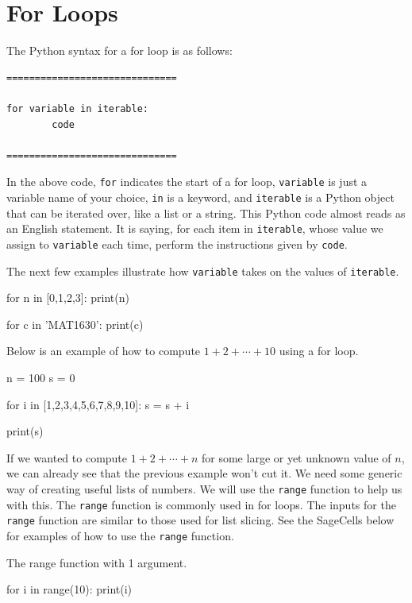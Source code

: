 \documentclass{ximera}
\begin{document}
\section{For Loops}

The Python syntax for a for loop is as follows:

\begin{verbatim}
==============================

for variable in iterable:
        code

==============================
\end{verbatim}

In the above code, \verb|for| indicates the start of a for loop, \verb|variable| is just a variable name of your choice, \verb|in| is a keyword, and \verb|iterable| is a Python object that can be iterated over, like a list or a string. This Python code almost reads as an English statement. It is saying, for each item in \verb|iterable|, whose value we assign to \verb|variable| each time, perform the instructions given by \verb|code|.

The next few examples illustrate how \verb|variable| takes on the values of \verb|iterable|.

\begin{sageCell}
for n in [0,1,2,3]:
        print(n)
\end{sageCell}

\begin{sageCell}
for c in 'MAT1630':
        print(c)
\end{sageCell}

Below is an example of how to compute $1+2+\cdots+10$ using a for loop. 

\begin{sageCell}
n = 100
s = 0

	for i in [1,2,3,4,5,6,7,8,9,10]:
        s = s + i

print(s)
\end{sageCell}

If we wanted to compute $1+2+\cdots+n$ for some large or yet unknown value of $n$, we can already see that the previous example won't cut it. We need some generic way of creating useful lists of numbers. We will use the \verb|range| function to help us with this. The \verb|range| function is commonly used in for loops. The inputs for the \verb|range| function are similar to those used for list slicing. See the SageCells below for examples of how to use the \verb|range| function.

The range function with 1 argument.
\begin{sageCell}
for i in range(10):
     print(i)
\end{sageCell}
\end{document}

